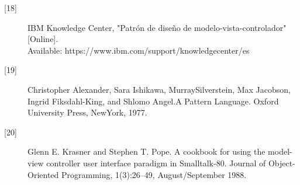 \begin{description}
		\item[\hypertarget{b18}{[18]}] IBM Knowledge Center, "Patrón de diseño de modelo-vista-controlador" [Online].\\ Available: https://www.ibm.com/support/knowledgecenter/es
		
		\item[\hypertarget{b19}{[19]}] Christopher Alexander, Sara Ishikawa, MurraySilverstein, Max Jacobson,
		Ingrid Fiksdahl-King, and Shlomo Angel.A Pattern Language. Oxford University
		Press, NewYork, 1977.
		
		\item[\hypertarget{b20}{[20]}] Glenn E. Krasner and Stephen T. Pope. A cookbook for using the model-view
		controller user interface paradigm in Smalltalk-80. Journal of Object-Oriented
		Programming, 1(3):26–49, August/September 1988. 
\end{description}